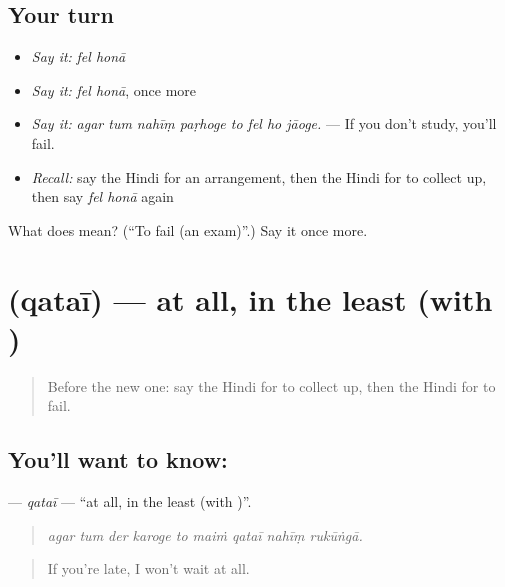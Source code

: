 \subsection*{Your turn}
\begin{itemize}
\raggedright
  \item \emph{Say it:} \emph{fel honā}
  \item \emph{Say it:} \emph{fel honā}, once more
  \item \emph{Say it:} \emph{agar tum nahīṃ paṛhoge to fel ho jāoge.} — If you don't study, you'll fail.
  \item \emph{Recall:} say the Hindi for an arrangement, then the Hindi for to collect up, then say \emph{fel honā} again
\end{itemize}

\begin{tcolorbox}[breakable,colback=teal!4,colframe=teal!35!black,title={Before you move on}]
What does   mean? (\textquotedblleft{}To fail (an exam)\textquotedblright{}.) Say it once more.
\end{tcolorbox}
\section[\texorpdfstring{\hi{क़तई} (qataī)}{क़तई (qataī)}]{ (qataī) — at all, in the least (with )}

\label{lesson:HI-C395-qatai}



\begin{quote}
Before the new one: say the Hindi for to collect up, then the Hindi for to fail.
\end{quote}

\subsection*{You'll want to know: }
\textbf{} — \emph{qataī} — \textquotedblleft{}at all, in the least (with )\textquotedblright{}.

\begin{quote}
        
\end{quote}

\begin{quote}
\emph{agar tum der karoge to maiṁ qataī nahīṃ rukūṅgā.}
\end{quote}

\begin{quote}
If you're late, I won't wait at all.
\end{quote}


